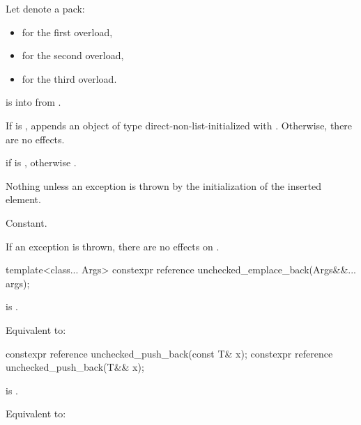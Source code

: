 \begin{itemdescr}
\pnum
Let  denote a pack:
\begin{itemize}
\item {} for the first overload,
\item {} for the second overload,
\item {} for the third overload.
\end{itemize}

\pnum
\expects
{} is 
into  from .

\pnum
\effects
If  is ,
appends an object of type 
direct-non-list-initialized with .
Otherwise, there are no effects.

\pnum
\returns
{} if  is ,
otherwise .

\pnum
\throws
Nothing unless an exception is thrown by the initialization of the inserted element.

\pnum
\complexity
Constant.

\pnum
\remarks
If an exception is thrown, there are no effects on .
\end{itemdescr}

%
\begin{itemdecl}
template<class... Args>
  constexpr reference unchecked_emplace_back(Args&&... args);
\end{itemdecl}

\begin{itemdescr}
\pnum
\expects
{} is .

\pnum
\effects
Equivalent to:
\end{itemdescr}

%
\begin{itemdecl}
constexpr reference unchecked_push_back(const T& x);
constexpr reference unchecked_push_back(T&& x);
\end{itemdecl}

\begin{itemdescr}
\pnum
\expects
{} is .

\pnum
\effects
Equivalent to:
\end{itemdescr}

